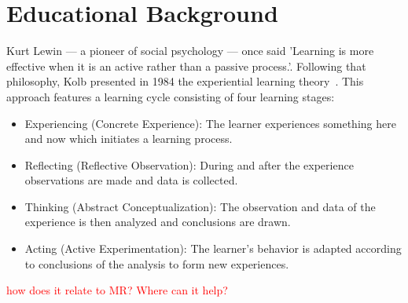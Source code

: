 %
\chapter{Educational Background}
\label{sec:concepts}

Kurt Lewin --- a pioneer of social psychology --- once said 'Learning is more effective when it is an active rather than a passive process.'. Following that philosophy, Kolb presented in 1984 the experiential learning theory~\cite{kolb:1984:experiential}.
This approach features a learning cycle consisting of four learning stages:
\begin{itemize}
    \item Experiencing (Concrete Experience): The learner experiences something here and now which initiates a learning process.
    \item Reflecting (Reflective Observation): During and after the experience observations are made and data is collected.
    \item Thinking (Abstract Conceptualization): The observation and data of the experience is then analyzed and conclusions are drawn.
    \item Acting (Active Experimentation): The learner's behavior is adapted according to conclusions of the analysis to form new experiences. 
\end{itemize}




\textcolor{red}{how does it relate to MR? Where can it help? }

